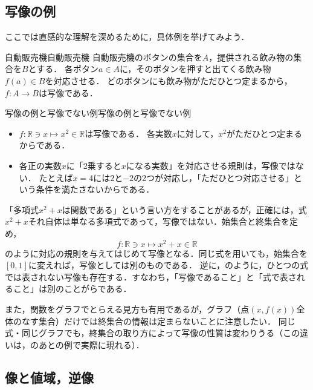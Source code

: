 \subsection{写像の例}

ここでは直感的な理解を深めるために，具体例を挙げてみよう．

\begin{example}{自動販売機}{自動販売機}
  自動販売機のボタンの集合を$A$，提供される飲み物の集合を$B$とする．
  各ボタン$a \in A$に，そのボタンを押すと出てくる飲み物$f(a) \in B$を対応させる．
  どのボタンにも飲み物がただひとつ定まるから，$f \colon A \to B$は写像である．
\end{example}

\begin{example}{写像の例と写像でない例}{写像の例と写像でない例}
  \begin{itemize}
    \item $f \colon \mathbb{R} \ni x \mapsto x^2 \in \mathbb{R}$は写像である．
          各実数$x$に対して，$x^2$がただひとつ定まるからである．
    \item 各正の実数$x$に「2乗すると$x$になる実数」を対応させる規則は，写像ではない．
          たとえば$x = 4$には$2$と$-2$の2つが対応し，「ただひとつ対応させる」という条件を満たさないからである．
  \end{itemize}
\end{example}

\begin{mycolumn}
  「多項式$x^2 + x$は関数である」という言い方をすることがあるが，正確には，式$x^2 + x$それ自体は単なる多項式であって，写像ではない．始集合と終集合を定め，
  \[
    f \colon \mathbb{R} \ni x \mapsto x^2 + x \in \mathbb{R}
  \]
  のように対応の規則を与えてはじめて写像となる．同じ式を用いても，始集合を$[0, 1]$に変えれば，写像としては別のものである．
  逆に，のように，ひとつの式では表されない写像も存在する．すなわち，「写像であること」と「式で表されること」は別のことがらである．

  また，関数をグラフでとらえる見方も有用であるが，グラフ（点$(x, f(x))$全体のなす集合）だけでは終集合の情報は定まらないことに注意したい．
  同じ式・同じグラフでも，終集合の取り方によって写像の性質は変わりうる（この違いは，のあとの例で実際に現れる）．
\end{mycolumn}


\subsection{像と値域，逆像}

